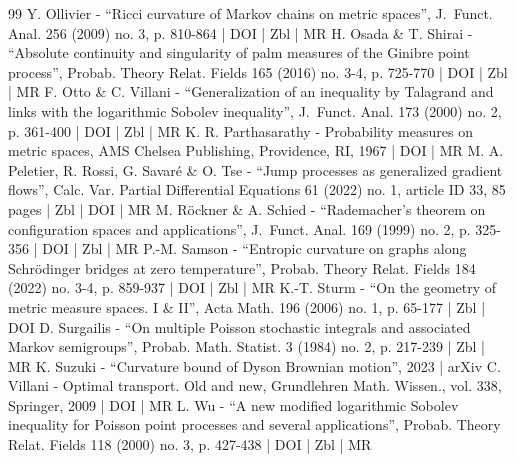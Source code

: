\documentclass[10pt]{amsart}
\theoremstyle{definition}
\theoremstyle{remark}
\begin{document}
\begin{thebibliography}{99}
Y. Ollivier - “Ricci curvature of Markov chains on metric spaces”, J. Funct. Anal. 256 (2009) no. 3, p. 810-864 | DOI | Zbl | MR
H. Osada \& T. Shirai - “Absolute continuity and singularity of palm measures of the Ginibre point process”, Probab. Theory Relat. Fields 165 (2016) no. 3-4, p. 725-770 | DOI | Zbl | MR
F. Otto \& C. Villani - “Generalization of an inequality by Talagrand and links with the logarithmic Sobolev inequality”, J. Funct. Anal. 173 (2000) no. 2, p. 361-400 | DOI | Zbl | MR
K. R. Parthasarathy - Probability measures on metric spaces, AMS Chelsea Publishing, Providence, RI, 1967 | DOI | MR
M. A. Peletier, R. Rossi, G. Savaré \& O. Tse - “Jump processes as generalized gradient flows”, Calc. Var. Partial Differential Equations 61 (2022) no. 1, article ID 33, 85 pages | Zbl | DOI | MR
M. Röckner \& A. Schied - “Rademacher’s theorem on configuration spaces and applications”, J. Funct. Anal. 169 (1999) no. 2, p. 325-356 | DOI | Zbl | MR
P.-M. Samson - “Entropic curvature on graphs along Schrödinger bridges at zero temperature”, Probab. Theory Relat. Fields 184 (2022) no. 3-4, p. 859-937 | DOI | Zbl | MR
K.-T. Sturm - “On the geometry of metric measure spaces. I \& II”, Acta Math. 196 (2006) no. 1, p. 65-177 | Zbl | DOI
D. Surgailis - “On multiple Poisson stochastic integrals and associated Markov semigroups”, Probab. Math. Statist. 3 (1984) no. 2, p. 217-239 | Zbl | MR
K. Suzuki - “Curvature bound of Dyson Brownian motion”, 2023 | arXiv
C. Villani - Optimal transport. Old and new, Grundlehren Math. Wissen., vol. 338, Springer, 2009 | DOI | MR
L. Wu - “A new modified logarithmic Sobolev inequality for Poisson point processes and several applications”, Probab. Theory Relat. Fields 118 (2000) no. 3, p. 427-438 | DOI | Zbl | MR
\end{thebibliography}
\end{document}
